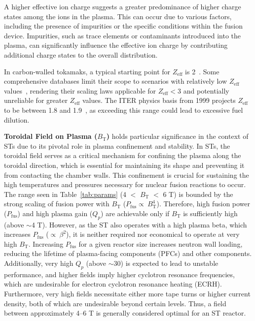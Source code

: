 \documentclass[journal]{IEEEtran}
\begin{document}
A higher effective ion charge suggests a greater predominance of higher charge states among the ions in the plasma. This can occur due to various factors, including the presence of impurities or the specific conditions within the fusion device. Impurities, such as trace elements or contaminants introduced into the plasma, can significantly influence the effective ion charge by contributing additional charge states to the overall distribution.

In carbon-walled tokamaks, a typical starting point for $Z_{\text{eff}}$ is 2~\cite{Carlstrom1999, Eich2011}. Some comprehensive databases limit their scope to scenarios with relatively low $Z_{\text{eff}}$ values~\cite{Schissel1988}, rendering their scaling laws applicable for $Z_{\text{eff}}$$<$3 and potentially unreliable for greater $Z_{\text{eff}}$ values. The ITER physics basis from 1999 projects $Z_{\text{eff}}$ to be between 1.8 and 1.9~\cite{ITER19991, ITER19994}, as exceeding this range could lead to excessive fuel dilution.

\textbf{Toroidal Field on Plasma ($B_{\text{T}}$)} holds particular significance in the context of STs due to its pivotal role in plasma confinement and stability. In STs, the toroidal field serves as a critical mechanism for confining the plasma along the toroidal direction, which is essential for maintaining its shape and preventing it from contacting the chamber walls. This confinement is crucial for sustaining the high temperatures and pressures necessary for nuclear fusion reactions to occur. The range seen in Table~\ref{tab:params} (4 $<$ $B_{\text{T}}$ $<$ 6 T) is bounded by the strong scaling of fusion power with $B_{\text{T}}$ ($P_{\text{fus}} \propto~B_{\text{T}}^4$). Therefore, high fusion power ($P_{\text{fus}}$) and high plasma gain ($Q_p$) are achievable only if $B_{\text{T}}$ is sufficiently high (above $\sim$4 T). However, as the ST also operates with a high plasma beta, which increases $P_{\text{fus}}$ ($\propto~\beta^2$), it is neither required nor economical to operate at very high $B_{\text{T}}$. Increasing $P_{\text{fus}}$ for a given reactor size increases neutron wall loading, reducing the lifetime of plasma-facing components (PFCs) and other components. Additionally, very high $Q_p$ (above $\sim$30) is expected to lead to unstable performance, and higher fields imply higher cyclotron resonance frequencies, which are undesirable for electron cyclotron resonance heating (ECRH). Furthermore, very high fields necessitate either more tape turns or higher current density, both of which are undesirable beyond certain levels. Thus, a field between approximately 4--6 T is generally considered optimal for an ST reactor.
\end{document}
